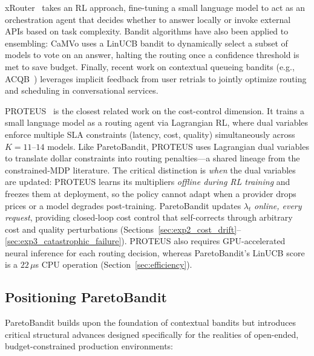 xRouter~\cite{qian2025xrouter} takes an RL approach, fine-tuning a small language model to act as an orchestration agent that decides whether to answer locally or invoke external APIs based on task complexity. Bandit algorithms have also been applied to ensembling: CaMVo uses a LinUCB bandit to dynamically select a subset of models to vote on an answer, halting the routing once a confidence threshold is met to save budget. Finally, recent work on contextual queueing bandits (e.g., ACQB~\cite{bae2026learning}) leverages implicit feedback from user retrials to jointly optimize routing and scheduling in conversational services.

PROTEUS~\cite{bhatti2026proteus} is the closest related work on the cost-control dimension.  It trains a small language model as a routing agent via Lagrangian RL, where dual variables enforce multiple SLA constraints (latency, cost, quality) simultaneously across $K{=}11$--$14$ models.  Like ParetoBandit, PROTEUS uses Lagrangian dual variables to translate dollar constraints into routing penalties---a shared lineage from the constrained-MDP literature.  The critical distinction is \emph{when} the dual variables are updated: PROTEUS learns its multipliers \emph{offline during RL training} and freezes them at deployment, so the policy cannot adapt when a provider drops prices or a model degrades post-training.  ParetoBandit updates $\lambda_t$ \emph{online, every request}, providing closed-loop cost control that self-corrects through arbitrary cost and quality perturbations (Sections~\ref{sec:exp2_cost_drift}--\ref{sec:exp3_catastrophic_failure}).  PROTEUS also requires GPU-accelerated neural inference for each routing decision, whereas ParetoBandit's LinUCB score is a $22\,\mu$s CPU operation (Section~\ref{sec:efficiency}).

\subsection{Positioning ParetoBandit}

ParetoBandit builds upon the foundation of contextual bandits but introduces critical structural advances designed specifically for the realities of open-ended, budget-constrained production environments:

